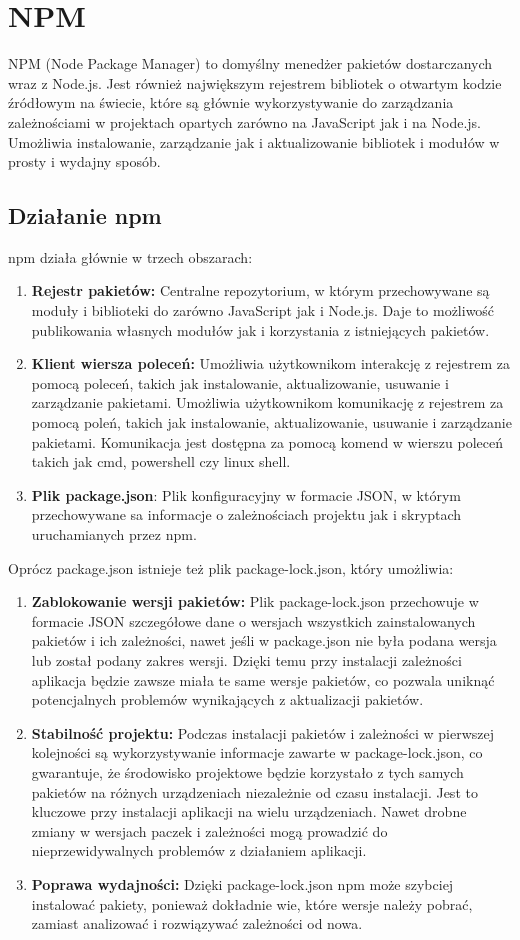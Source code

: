 \section{NPM}
\label{section:NPM}
NPM (Node Package Manager) to domyślny menedżer pakietów dostarczanych wraz z Node.js. Jest również największym rejestrem bibliotek o otwartym kodzie źródłowym na świecie, które są głównie wykorzystywanie do zarządzania zależnościami w projektach opartych zarówno na JavaScript jak i na Node.js. Umożliwia instalowanie, zarządzanie jak i aktualizowanie bibliotek i modułów w prosty i wydajny sposób.
\subsection{Działanie npm}
npm działa głównie w trzech obszarach:
\begin{enumerate}
    \item \textbf{Rejestr pakietów:} Centralne repozytorium, w którym przechowywane są moduły i biblioteki do zarówno JavaScript jak i Node.js. Daje to możliwość publikowania własnych modułów jak i korzystania z istniejących pakietów.
    \item \textbf{Klient wiersza poleceń:} Umożliwia użytkownikom interakcję z rejestrem za pomocą poleceń, takich jak instalowanie, aktualizowanie, usuwanie i zarządzanie pakietami.
    Umożliwia użytkownikom komunikację z rejestrem za pomocą poleń, takich jak instalowanie, aktualizowanie, usuwanie i zarządzanie pakietami. Komunikacja jest dostępna za pomocą komend w wierszu poleceń takich jak cmd, powershell czy linux shell.
    \item \textbf{Plik package.json}: Plik konfiguracyjny w formacie JSON, w którym przechowywane sa informacje o zależnościach projektu jak i skryptach uruchamianych przez npm.
\end{enumerate}
Oprócz package.json istnieje też plik package-lock.json, który umożliwia:
\begin{enumerate}
    \item \textbf{Zablokowanie wersji pakietów:} Plik package-lock.json przechowuje w formacie JSON szczegółowe dane o wersjach wszystkich zainstalowanych pakietów i ich zależności, nawet jeśli w package.json nie była podana wersja lub został podany zakres wersji. Dzięki temu przy instalacji zależności aplikacja będzie zawsze miała te same wersje pakietów, co pozwala uniknąć potencjalnych problemów wynikających z aktualizacji pakietów.
    \item \textbf{Stabilność projektu:}  Podczas instalacji pakietów i zależności w pierwszej kolejności są wykorzystywanie informacje zawarte w package-lock.json, co gwarantuje, że środowisko projektowe będzie korzystało z tych samych pakietów na różnych urządzeniach niezależnie od czasu instalacji. Jest to kluczowe przy instalacji aplikacji na wielu urządzeniach. Nawet drobne zmiany w wersjach paczek i zależności mogą prowadzić do nieprzewidywalnych problemów z działaniem aplikacji.
    \item \textbf{Poprawa wydajności:} Dzięki package-lock.json npm może szybciej instalować pakiety, ponieważ dokładnie wie, które wersje należy pobrać, zamiast analizować i rozwiązywać zależności od nowa.
\end{enumerate}

